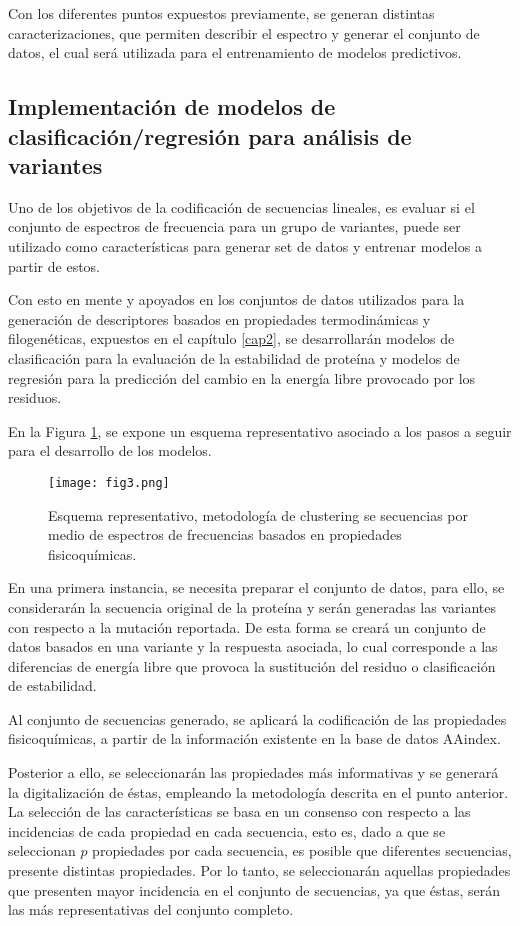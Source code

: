 Con los diferentes puntos expuestos previamente, se generan distintas caracterizaciones, que permiten describir el espectro y generar el conjunto de datos, el cual será utilizada para el entrenamiento de modelos predictivos.

\subsection{Implementación de modelos de clasificación/regresión para análisis de variantes}

Uno de los objetivos de la codificación de secuencias lineales, es evaluar si el conjunto de espectros de frecuencia para un grupo de variantes, puede ser utilizado como características para generar set de datos y entrenar modelos a partir de estos.

Con esto en mente y apoyados en los conjuntos de datos utilizados para la generación de descriptores basados en propiedades termodinámicas y filogenéticas, expuestos en el capítulo \ref{cap2}, se desarrollarán modelos de clasificación para la evaluación de la estabilidad de proteína y modelos de regresión para la predicción del cambio en la energía libre provocado por los residuos.

En la Figura \ref{cap3:fig3}, se expone un esquema representativo asociado a los pasos a seguir para el desarrollo de los modelos.

\begin{figure}[!h]
	
	\centering
	\texttt{[image: fig3.png]}
	\caption{Esquema representativo, metodología de clustering se secuencias por medio de espectros de frecuencias basados en propiedades fisicoquímicas.}
	\label{cap3:fig3}
\end{figure}


En una primera instancia, se necesita preparar el conjunto de datos, para ello, se considerarán la secuencia original de la proteína y serán generadas las variantes con respecto a la mutación reportada. De esta forma se creará un conjunto de datos basados en una variante y la respuesta asociada, lo cual corresponde a las diferencias de energía libre que provoca la sustitución del residuo o clasificación de estabilidad.

Al conjunto de secuencias generado, se aplicará la codificación de las propiedades fisicoquímicas, a partir de la información existente en la base de datos AAindex.

Posterior a ello, se seleccionarán las propiedades más informativas y se generará la digitalización de éstas, empleando la metodología descrita en el punto anterior. La selección de las características se basa en un consenso con respecto a las incidencias de cada propiedad en cada secuencia, esto es, dado a que se seleccionan $p$ propiedades por cada secuencia, es posible que diferentes secuencias, presente distintas propiedades. Por lo tanto, se seleccionarán aquellas propiedades que presenten mayor incidencia en el conjunto de secuencias, ya que éstas, serán las más representativas del conjunto completo. 

